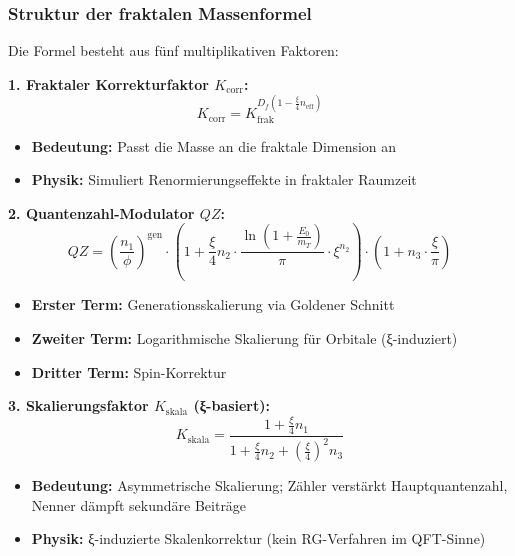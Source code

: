 	\subsubsection{Struktur der fraktalen Massenformel}
	
	Die Formel besteht aus fünf multiplikativen Faktoren:
	
	\textbf{1. Fraktaler Korrekturfaktor $K_{\text{corr}}$:}
	\begin{equation}
		K_{\text{corr}} = K_{\text{frak}}^{D_f \left(1 - \frac{\xi}{4} n_{\text{eff}}\right)}
	\end{equation}
	\begin{itemize}
		\item \textbf{Bedeutung:} Passt die Masse an die fraktale Dimension an
		\item \textbf{Physik:} Simuliert Renormierungseffekte in fraktaler Raumzeit
	\end{itemize}
	
	\textbf{2. Quantenzahl-Modulator $QZ$:}
	\begin{equation}
		QZ = \left( \frac{n_1}{\phi} \right)^{\text{gen}} \cdot \left(1 + \frac{\xi}{4} n_2 \cdot \frac{\ln\left(1 + \frac{E_0}{m_T}\right)}{\pi} \cdot \xi^{n_2}\right) \cdot \left(1 + n_3 \cdot \frac{\xi}{\pi}\right)
	\end{equation}
	\begin{itemize}
		\item \textbf{Erster Term:} Generationsskalierung via Goldener Schnitt
		\item \textbf{Zweiter Term:} Logarithmische Skalierung für Orbitale (ξ-induziert)
		\item \textbf{Dritter Term:} Spin-Korrektur
	\end{itemize}
	
	\textbf{3. Skalierungsfaktor $K_{\text{skala}}$ (ξ-basiert):}
	\begin{equation}
		K_{\text{skala}} = \frac{1 + \frac{\xi}{4} n_1}{1 + \frac{\xi}{4} n_2 + \left(\frac{\xi}{4}\right)^2 n_3}
	\end{equation}
	\begin{itemize}
		\item \textbf{Bedeutung:} Asymmetrische Skalierung; Zähler verstärkt Hauptquantenzahl, Nenner dämpft sekundäre Beiträge
		\item \textbf{Physik:} ξ-induzierte Skalenkorrektur (kein RG-Verfahren im QFT-Sinne)
	\end{itemize}
	
